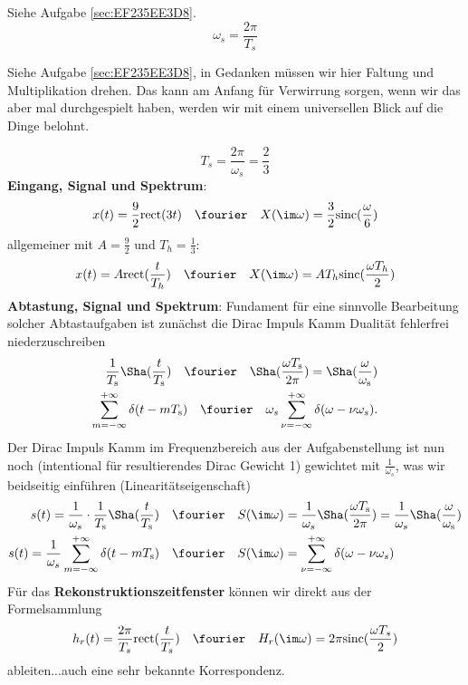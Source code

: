 \begin{Werkzeug}
Siehe Aufgabe \ref{sec:EF235EE3D8}.
$$\omega_s = \frac{2\pi}{T_s}$$
\end{Werkzeug}
\begin{Ansatz}
Siehe Aufgabe \ref{sec:EF235EE3D8}, in Gedanken müssen wir hier Faltung und
Multiplikation drehen. Das kann am Anfang für Verwirrung sorgen, wenn wir das
aber mal durchgespielt haben, werden wir mit einem
universellen Blick auf die Dinge belohnt.
\end{Ansatz}
\begin{ExCalc}
$$T_s = \frac{2\pi}{\omega_s} = \frac{2}{3}$$
\textbf{Eingang, Signal und Spektrum}:
\begin{align}
x(t) = \frac{9}{2} \mathrm{rect}(3 t)
\quad\fourier\quad
X(\im\omega) = \frac{3}{2}\mathrm{sinc}(\frac{\omega}{6})
\end{align}
allgemeiner mit $A = \frac{9}{2}$ und $T_h=\frac{1}{3}$:
\begin{align}
x(t) = A \mathrm{rect}(\frac{t}{T_h})
\quad\fourier\quad
X(\im\omega) = A T_h\mathrm{sinc}(\frac{\omega T_h}{2})
\end{align}
%
\textbf{Abtastung, Signal und Spektrum}:
Fundament für eine sinnvolle Bearbeitung solcher Abtastaufgaben ist zunächst die
Dirac Impuls Kamm Dualität fehlerfrei niederzuschreiben
\begin{align}
\frac{1}{T_\mathrm{s}} {\Sha}(\frac{t}{T_\mathrm{s}}) \quad\fourier\quad
{\Sha}(\frac{\omega T_\mathrm{s}}{2 \pi}) =
\Sha(\frac{\omega}{\omega_\mathrm{s}})\\
\sum_{m=-\infty}^{+\infty} \delta(t-m T_\mathrm{s}) \quad\fourier\quad
\omega_s \sum_{\nu=-\infty}^{+\infty} \delta(\omega-\nu \omega_s).
\end{align}
%
Der Dirac Impuls Kamm im Frequenzbereich aus der Aufgabenstellung ist nun noch
(intentional für resultierendes Dirac Gewicht 1) gewichtet mit $\frac{1}{\omega_s}$,
was wir beidseitig einführen (Linearitätseigenschaft)
\begin{align}
s(t) = \frac{1}{\omega_s}\cdot\frac{1}{T_\mathrm{s}} {\Sha}(\frac{t}{T_\mathrm{s}}) &\quad\fourier\quad
S(\im\omega) = \frac{1}{\omega_s} {\Sha}(\frac{\omega T_\mathrm{s}}{2 \pi}) =
\frac{1}{\omega_s}\Sha(\frac{\omega}{\omega_\mathrm{s}})\\
s(t) = \frac{1}{\omega_s} \sum_{m=-\infty}^{+\infty} \delta(t-m T_\mathrm{s}) &\quad\fourier\quad
S(\im\omega) = \sum_{\nu=-\infty}^{+\infty} \delta(\omega-\nu \omega_s)
\end{align}
%
Für das \textbf{Rekonstruktionszeitfenster} können wir direkt aus der Formelsammlung
\begin{align}
h_r(t) = \frac{2\pi}{T_s}\mathrm{rect}(\frac{t}{T_s})
\quad\fourier\quad
H_r(\im\omega) = 2\pi \mathrm{sinc}(\frac{\omega T_s}{2})
\end{align}
ableiten...auch eine sehr bekannte Korrespondenz.
%
\end{ExCalc}
